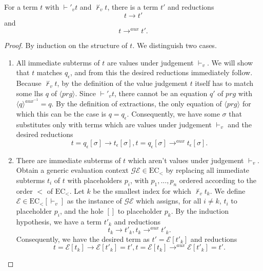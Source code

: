 \begin{lemma}

For a term $t$ with $\vdash'_v t$ and $\not\vdash_v t$, there is a term $t'$ and reductions
\[
t \longrightarrow t'
\]
and
\[
t \longrightarrow^{aux} t'.
\]

\begin{proof}

By induction on the structure of $t$. We distinguish two cases.
\begin{enumerate}
\item All immediate subterms of $t$ are values under judgement $\vdash_v$. We will show that $t$ matches $q_\epsilon$, and from this the desired reductions immediately follow. Because $\not\vdash_v t$, by the definition of the value judgement $t$ itself has to match some lhs $q$ of $\langle prg \rangle$. Since $\vdash'_v t$, there cannot be an equation $q'$ of $prg$ with $\langle q \rangle^{aux^{-1}} = q$. By the definition of extractions, the only equation of $\langle prg \rangle$ for which this can be the case is $q = q_\epsilon$. Consequently, we have some $\sigma$ that substitutes only with terms which are values under judgement $\vdash_v$ and the desired reductions
\[
t = q_\epsilon[\sigma] \longrightarrow t_\epsilon[\sigma], t = q_\epsilon[\sigma] \longrightarrow^{aux} t_\epsilon[\sigma].
\]

\item There are immediate subterms of $t$ which aren't values under judgement $\vdash_v$. Obtain a generic evaluation context $\mathcal{GE} \in \textrm{EC}_<$ by replacing all immediate subterms $t_i$ of $t$ with placeholders $p_i$, with $p_1, ..., p_n$ ordered according to the order $<$ of $\textrm{EC}_<$. Let $k$ be the smallest index for which $\not\vdash_v t_k$. We define $\mathcal{E} \in \textrm{EC}_<[\vdash_v]$ as the instance of $\mathcal{GE}$ which assigns, for all $i \neq k$, $t_i$ to placeholder $p_i$, and the hole $[]$ to placeholder $p_k$. By the induction hypothesis, we have a term $t'_k$ and reductions
\[
t_k \longrightarrow t'_k, t_k \longrightarrow^{aux} t'_k.
\]
Consequently, we have the desired term as $t' = \mathcal{E}[t'_k]$ and reductions
\[
t = \mathcal{E}[t_k] \longrightarrow \mathcal{E}[t'_k] = t', t = \mathcal{E}[t_k] \longrightarrow^{aux} \mathcal{E}[t'_k] = t'.
\]
\end{enumerate}

\end{proof}

\end{lemma}

